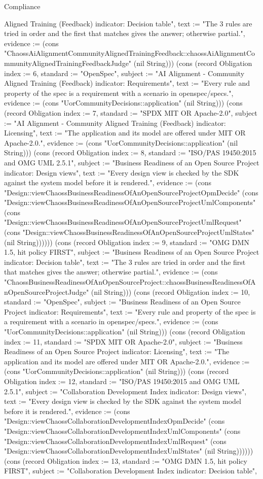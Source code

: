 \begin{lexlean}{Compliance}
\begin{semanticmodule}
{Aligned Training (Feedback) indicator: Decision table", text := "The 3 rules are tried in order and the first that matches gives the answer; otherwise partial.", evidence := (cons "ChaossAiAlignmentCommunityAlignedTrainingFeedback::chaossAiAlignmentCommunityAlignedTrainingFeedbackJudge" (nil String))}) (cons (record Obligation {index := 6, standard := "OpenSpec", subject := "AI Alignment - Community Aligned Training (Feedback) indicator: Requirements", text := "Every rule and property of the spec is a requirement with a scenario in openspec/specs.", evidence := (cons "UorCommunityDecisions::application" (nil String))}) (cons (record Obligation {index := 7, standard := "SPDX MIT OR Apache-2.0", subject := "AI Alignment - Community Aligned Training (Feedback) indicator: Licensing", text := "The application and its model are offered under MIT OR Apache-2.0.", evidence := (cons "UorCommunityDecisions::application" (nil String))}) (cons (record Obligation {index := 8, standard := "ISO/PAS 19450:2015 and OMG UML 2.5.1", subject := "Business Readiness of an Open Source Project indicator: Design views", text := "Every design view is checked by the SDK against the system model before it is rendered.", evidence := (cons "Design::viewChaossBusinessReadinessOfAnOpenSourceProjectOpmDecide" (cons "Design::viewChaossBusinessReadinessOfAnOpenSourceProjectUmlComponents" (cons "Design::viewChaossBusinessReadinessOfAnOpenSourceProjectUmlRequest" (cons "Design::viewChaossBusinessReadinessOfAnOpenSourceProjectUmlStates" (nil String)))))}) (cons (record Obligation {index := 9, standard := "OMG DMN 1.5, hit policy FIRST", subject := "Business Readiness of an Open Source Project indicator: Decision table", text := "The 3 rules are tried in order and the first that matches gives the answer; otherwise partial.", evidence := (cons "ChaossBusinessReadinessOfAnOpenSourceProject::chaossBusinessReadinessOfAnOpenSourceProjectJudge" (nil String))}) (cons (record Obligation {index := 10, standard := "OpenSpec", subject := "Business Readiness of an Open Source Project indicator: Requirements", text := "Every rule and property of the spec is a requirement with a scenario in openspec/specs.", evidence := (cons "UorCommunityDecisions::application" (nil String))}) (cons (record Obligation {index := 11, standard := "SPDX MIT OR Apache-2.0", subject := "Business Readiness of an Open Source Project indicator: Licensing", text := "The application and its model are offered under MIT OR Apache-2.0.", evidence := (cons "UorCommunityDecisions::application" (nil String))}) (cons (record Obligation {index := 12, standard := "ISO/PAS 19450:2015 and OMG UML 2.5.1", subject := "Collaboration Development Index indicator: Design views", text := "Every design view is checked by the SDK against the system model before it is rendered.", evidence := (cons "Design::viewChaossCollaborationDevelopmentIndexOpmDecide" (cons "Design::viewChaossCollaborationDevelopmentIndexUmlComponents" (cons "Design::viewChaossCollaborationDevelopmentIndexUmlRequest" (cons "Design::viewChaossCollaborationDevelopmentIndexUmlStates" (nil String)))))}) (cons (record Obligation {index := 13, standard := "OMG DMN 1.5, hit policy FIRST", subject := "Collaboration Development Index indicator: Decision table", }
\end{semanticmodule}
\end{lexlean}
